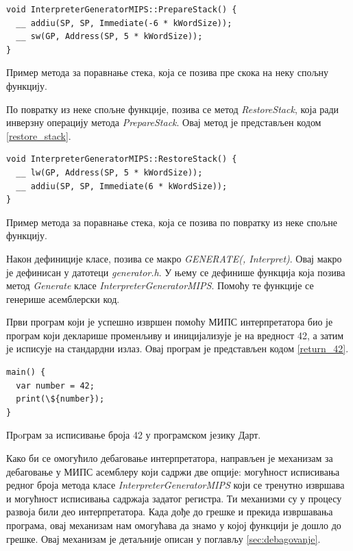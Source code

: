 \documentclass[12pt,oneside]{memoir}
\begin{document}
\begin{listing}
\begin{verbatim}
void InterpreterGeneratorMIPS::PrepareStack() {
  __ addiu(SP, SP, Immediate(-6 * kWordSize));
  __ sw(GP, Address(SP, 5 * kWordSize));
}
\end{verbatim}
\caption{Пример метода за поравнање стека, која се позива пре скока на неку спољну функцију.}
\label{prepare_stack}
\end{listing}

По повратку из неке спољне функције, позива се метод \textit{RestoreStack}, која ради инверзну операцију метода \textit{PrepareStack}. Овај метод је представљен кодом \ref{restore_stack}.

\begin{listing}
\begin{verbatim}
void InterpreterGeneratorMIPS::RestoreStack() {
  __ lw(GP, Address(SP, 5 * kWordSize));
  __ addiu(SP, SP, Immediate(6 * kWordSize));
}
\end{verbatim}
\caption{Пример метода за поравнање стека, која се позива по повратку из неке спољне функцију.}
\label{restore_stack}
\end{listing}

Након дефиниције класе, позива се макро \textit{GENERATE(, Interpret)}. Овај макро је дефинисан у датотеци \textit{generator.h}. У њему се дефинише функција која позива метод \textit{Generate} класе \textit{InterpreterGeneratorMIPS}. Помоћу те функције се генерише асемблерски код.

Први програм који је успешно извршен помоћу МИПС интерпретатора био је програм који декларише променљиву и иницијализује је на вредност 42, а затим је исписује на стандардни излаз. Овај програм је представљен кодом \ref{return_42}.

\begin{listing}
\begin{verbatim}
main() {
  var number = 42;
  print(\${number});
}
\end{verbatim}
\caption{Прoграм за исписивање броја 42 у програмском језику Дарт.}
\label{return_42}
\end{listing}

Како би се омогућило дебаговање интерпретатора, направљен је механизам за дебаговање у МИПС асемблеру који садржи две опције: могућност исписивања редног броја метода класе \textit{InterpreterGeneratorMIPS} који се тренутно извршава и могућност исписивања садржаја задатог регистра. Ти механизми су у процесу развоја били део интерпретатора. Када дође до грешке и прекида извршавања програма, овај механизам нам омогућава да знамо у којој функцији је дошло до грешке. Овај механизам је детаљније описан у поглављу \ref{sec:debagovanje}.
\end{document}
